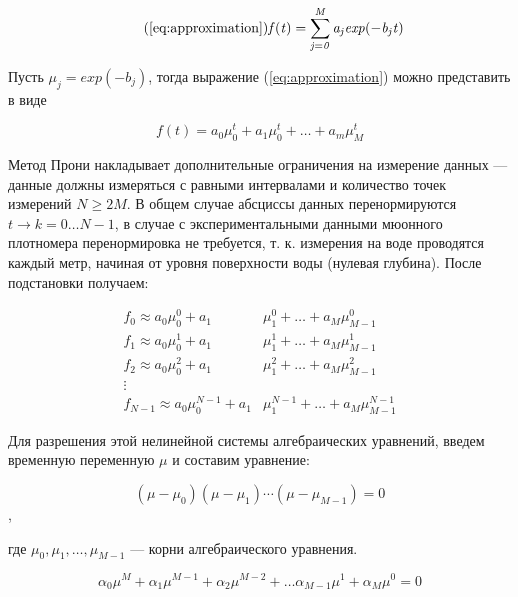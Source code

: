 \begin{equation}
  \tag{\ref{eq:approximation}}
  \mathit{ f(t)  = \displaystyle\sum_{j=0}^M a_j exp(-b_j t) }  
\end{equation}

Пусть $\mu_j = exp(-b_j)$, тогда выражение (\ref{eq:approximation}) можно представить в виде 

\begin{equation}
  \label{eq:prony_nonlinear}
  \mathit{ f(t)  = a_0 \mu_0^t + a_1 \mu_0^t + \ldots + a_m \mu_M^t }
\end{equation}


Метод Прони накладывает дополнительные ограничения на измерение данных --- данные должны измеряться с равными 
интервалами и количество точек измерений $N \geq 2M$. В общем случае абсциссы данных перенормируются $t \to k = 0 \ldots N-1$, 
в случае с экспериментальными данными мюонного плотномера перенормировка не требуется, т. к. измерения на воде
проводятся каждый метр, начиная от уровня поверхности воды (нулевая глубина). После подстановки получаем:

\begin{equation}
  \begin{split}
  f_0  \approx a_0 \mu_0^0 + a_1 & \mu_1^0 + \ldots + a_M \mu_{M-1}^0 \\
  f_1  \approx a_0 \mu_0^1 + a_1 & \mu_1^1 + \ldots + a_M \mu_{M-1}^1  \\
  f_2  \approx a_0 \mu_0^2 + a_1 & \mu_1^2 + \ldots + a_M \mu_{M-1}^2  \\
  \vdots & \\
  f_{N-1} \approx a_0 \mu_{0}^{N-1} + a_1 & \mu_{1}^{N-1} + \ldots + a_M \mu_{M-1}^{N-1}
  \end{split}
  \label{eq:prony_system}
\end{equation}

Для разрешения этой нелинейной системы алгебраических уравнений, введем временную переменную $\mu$ и составим уравнение: 

\begin{equation}
\label{eq:prony_algebra}
	\left( \mu - \mu_0 \right) 
	\left( \mu - \mu_1 \right) \cdots 
	\left( \mu - \mu_{M-1} \right) = 0  
\end{equation},

где $\mu_0,\mu_1, \ldots , \mu_{M-1}$ --- корни алгебраического
уравнения. 

\begin{equation}
	\label{eq:prony_alpha}
	\alpha_0 \mu ^ M + 
	\alpha_1 \mu ^ {M-1} + 
	\alpha_2 \mu ^ {M-2} + \ldots
	\alpha_{M-1} \mu ^ 1 + 
	\alpha_{M} \mu ^ 0 = 0
\end{equation}

